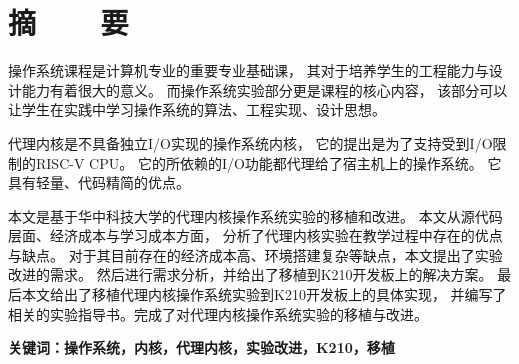 %
%
%
%
%

\vspace*{-11mm}

\begin{center}
  \heiti{}\textbf{\thesisTitle}
\end{center}

\vspace*{2mm}

{\let\clearpage\relax \chapter*{\textmd{摘~~~~要}}}
\setcounter{page}{1}

\vspace*{1mm}

\setlength{\parskip}{0em}

操作系统课程是计算机专业的重要专业基础课，
其对于培养学生的工程能力与设计能力有着很大的意义。
而操作系统实验部分更是课程的核心内容，
该部分可以让学生在实践中学习操作系统的算法、工程实现、设计思想。

代理内核是不具备独立I/O实现的操作系统内核，
它的提出是为了支持受到I/O限制的RISC-V CPU。
它的所依赖的I/O功能都代理给了宿主机上的操作系统。
它具有轻量、代码精简的优点。

本文是基于华中科技大学的代理内核操作系统实验的移植和改进。
本文从源代码层面、经济成本与学习成本方面，
分析了代理内核实验在教学过程中存在的优点与缺点。
对于其目前存在的经济成本高、环境搭建复杂等缺点，本文提出了实验改进的需求。
然后进行需求分析，并给出了移植到K210开发板上的解决方案。
最后本文给出了移植代理内核操作系统实验到K210开发板上的具体实现，
并编写了相关的实验指导书。完成了对代理内核操作系统实验的移植与改进。

\vspace{4ex}\noindent\textbf{\heiti 关键词：操作系统，内核，代理内核，实验改进，K210，移植}
\newpage

